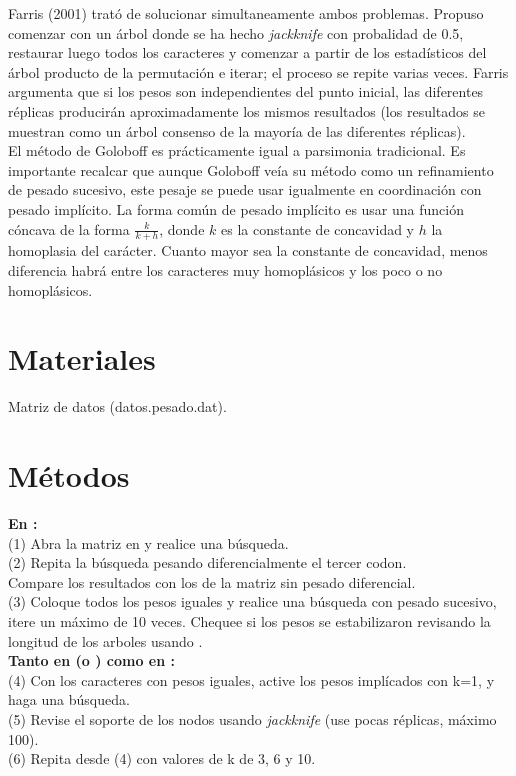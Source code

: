 Farris (2001) trat\'o de solucionar simultaneamente ambos problemas. Propuso comenzar con un \'arbol donde se ha hecho \textit{jackknife} con probalidad de 0.5, restaurar luego todos los caracteres y comenzar a partir de los estad\'isticos del \'arbol producto de la permutaci\'on e iterar; el proceso se repite varias veces. Farris argumenta que si los pesos son independientes del punto inicial, las diferentes r\'eplicas producir\'an aproximadamente los mismos resultados (los resultados se muestran como un \'arbol consenso de la mayor\'ia de las diferentes r\'eplicas).\\
El m\'etodo de Goloboff es pr\'acticamente igual a parsimonia tradicional. Es importante recalcar que aunque Goloboff ve\'ia su m\'etodo como un refinamiento de pesado sucesivo, este pesaje se puede usar igualmente en coordinaci\'on con pesado impl\'icito. La forma com\'un de pesado impl\'icito es usar una funci\'on c\'oncava de la forma $\frac{k}{k + h}$, donde $k$ es la constante de concavidad y $h$ la homoplasia del car\'acter. Cuanto mayor sea la constante de concavidad, menos diferencia habr\'a entre los caracteres muy homopl\'asicos y los poco o no homopl\'asicos.

\section{Materiales}
\noindent
Matriz de datos (datos.pesado.dat).

\section{M\'etodos}
\noindent
\textbf{En :}\\
(1) Abra la matriz en  y realice una b\'usqueda.\\
(2) Repita la b\'usqueda pesando diferencialmente el tercer codon.\\
Compare los resultados con los de la matriz sin pesado diferencial.\\
(3) Coloque todos los pesos iguales y realice una b\'usqueda con pesado sucesivo, itere un m\'aximo de 10 veces. Chequee si los pesos se estabilizaron revisando la longitud de los arboles usando .\\
\textbf{Tanto en  (o ) como en :}\\
(4) Con los caracteres con pesos iguales, active los pesos impl\'icados con k=1, y haga una b\'usqueda.\\
(5) Revise el soporte de los nodos usando \textit{jackknife} (use pocas r\'eplicas, m\'aximo 100).\\
(6) Repita desde (4) con valores de k de 3, 6 y 10.
